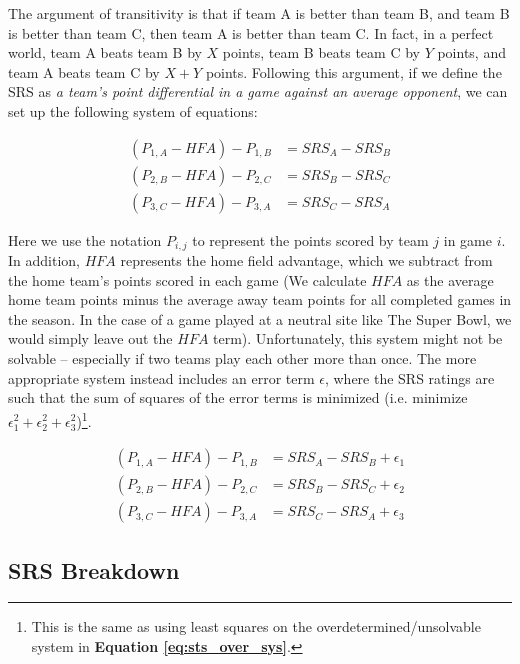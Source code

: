 \documentclass{report}
\begin{document}
The argument of transitivity is that if team A is better than team B, and team B is better than team C, then team A is better than team C.
In fact, in a perfect world, team A beats team B by $X$ points, team B beats team C by $Y$ points, and team A beats team C by $X+Y$ points.
Following this argument, if we define the SRS as \textit{a team's point differential in a game against an average opponent}, we can set up the following system of equations:

\begin{equation}\label{eq:sts_over_sys}
    \begin{aligned}
        (P_{1,A} - HFA) - P_{1,B} &= SRS_A - SRS_B \\
        (P_{2,B} - HFA) - P_{2,C} &= SRS_B - SRS_C \\
        (P_{3,C} - HFA) - P_{3,A} &= SRS_C - SRS_A
    \end{aligned}
\end{equation}

Here we use the notation $P_{i,j}$ to represent the points scored by team $j$ in game $i$.
In addition, $HFA$ represents the home field advantage, which we subtract from the home team's points scored in each game
(We calculate $HFA$ as the average home team points minus the average away team points for all completed games in the season.
In the case of a game played at a neutral site like The Super Bowl, we would simply leave out the $HFA$ term).
Unfortunately, this system might not be solvable -- especially if two teams play each other more than once.
The more appropriate system instead includes an error term $\epsilon$, where the SRS ratings are such that the sum of squares of the error terms is minimized (i.e. minimize $\epsilon_1^2+\epsilon_2^2+\epsilon_3^2$)\footnote{
    This is the same as using least squares on the overdetermined/unsolvable system in \textbf{Equation \ref{eq:sts_over_sys}}.
}.

\begin{equation}\label{eq:sts_over_sys_ep}
    \begin{aligned}
        (P_{1,A} - HFA) - P_{1,B} &= SRS_A - SRS_B + \epsilon_1 \\
        (P_{2,B} - HFA) - P_{2,C} &= SRS_B - SRS_C + \epsilon_2 \\
        (P_{3,C} - HFA) - P_{3,A} &= SRS_C - SRS_A + \epsilon_3
    \end{aligned}
\end{equation}

\subsection{SRS Breakdown}
\end{document}
